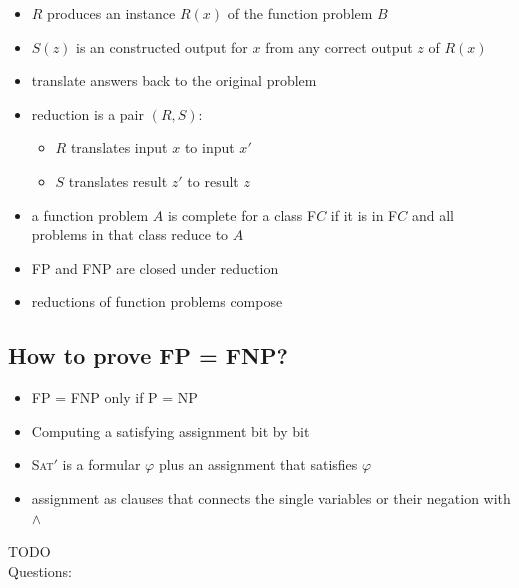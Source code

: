 \documentclass[a4]{scrartcl}
\begin{document}
\begin{itemize}
\item $R$ produces an instance $R(x)$ of the function problem $B$
\item $S(z)$ is an constructed output for $x$ from any correct output $z$ of $R(x)$
\item translate answers back to the original problem
\item reduction is a pair $(R,S)$:
\begin{itemize}
\item $R$ translates input $x$ to input $x'$
\item $S$ translates result $z'$ to result $z$
\end{itemize}

\item a function problem $A$ is complete for a class F$C$ if it is in F$C$ and all problems in that class reduce to $A$
\item FP and FNP are closed under reduction
\item reductions of function problems compose
\end{itemize}











\subsection*{How to prove FP = FNP?}



\begin{itemize}
\item FP = FNP only if P = NP

\item Computing a satisfying assignment bit by bit


\item \textsc{Sat$'$} is a formular $\varphi$ plus an assignment that satisfies $\varphi$
\item assignment as clauses that connects the single variables or their negation with $\land$
\end{itemize}

\color{red} TODO \\
\color{black}
\color{violet} Questions:
\color{black}
\end{document}
